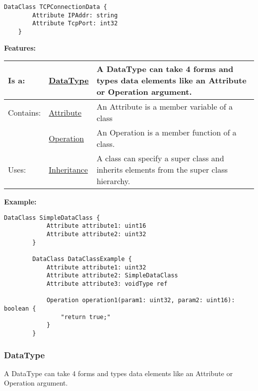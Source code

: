 	\begin{lstlisting}[language=ROOM]		
	DataClass TCPConnectionData {
		Attribute IPAddr: string
		Attribute TcpPort: int32
	}
	\end{lstlisting}
		
		
	\begingroup
	\textbf{Features:}
	\renewcommand{\arraystretch}{1.8} %
	\begin{longtable}{l|l p{}}
		\hline
	Is a: & \tabitem \hyperlink{ref:DataType}{DataType}  & A DataType can take 4 forms and types data elements like an Attribute or Operation argument.\\
	\hline
	Contains: & \tabitem \hyperlink{ref:Attribute}{Attribute}  & An Attribute is a member variable of a class\\
	& \tabitem \hyperlink{ref:Operation}{Operation}  & An Operation is a member function of a class. \\
	\hline
	Uses: & \tabitem \hyperlink{ref:Inheritance}{Inheritance}  & A class can specify a super class and inherits elements from the super class hierarchy.\\
	\hline
	\end{longtable}
	\endgroup
		
		
	\textbf{Example:}
	
		\begin{lstlisting}[language=ROOM]
		DataClass SimpleDataClass {
			Attribute attribute1: uint16
			Attribute attribute2: uint32
		}
		
		DataClass DataClassExample {
			Attribute attribute1: uint32
			Attribute attribute2: SimpleDataClass
			Attribute attribute3: voidType ref
			
			Operation operation1(param1: uint32, param2: uint16): boolean {
				"return true;"
			}
		}
		\end{lstlisting}
	
	\vspace{\baselineskip}
	\vspace{\baselineskip}
	\vspace{\baselineskip}
	
\subsubsection{DataType}
	\hypertarget{ref:DataType}{}
	A DataType can take 4 forms and types data elements like an Attribute or Operation argument.
		
		
		

